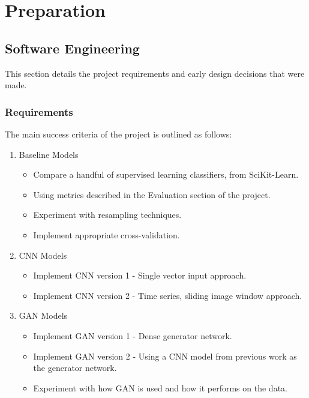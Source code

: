 \documentclass[12pt,a4paper,twoside]{report}
\begin{document}
\chapter{Preparation} \label{preparation}

\section{Software Engineering}

This section details the project requirements and early design decisions that were made.

\subsection{Requirements}
The main success criteria of the project is outlined as follows:

\begin{enumerate}
   \item Baseline Models
   \begin{itemize}
     \item Compare a handful of supervised learning classifiers, from SciKit-Learn.
     \item Using metrics described in the Evaluation section of the project.
     \item Experiment with resampling techniques. 
     \item Implement appropriate cross-validation.
   \end{itemize}
   \item CNN Models
   \begin{itemize}
     \item Implement CNN version 1 - Single vector input approach.
     \item Implement CNN version 2 - Time series, sliding image window approach.
   \end{itemize}
   \item GAN Models
   \begin{itemize}
     \item Implement GAN version 1 - Dense generator network.
     \item Implement GAN version 2 - Using a CNN model from previous work as the generator network.
     \item Experiment with how GAN is used and how it performs on the data.
   \end{itemize}
\end{enumerate}
\end{document}
